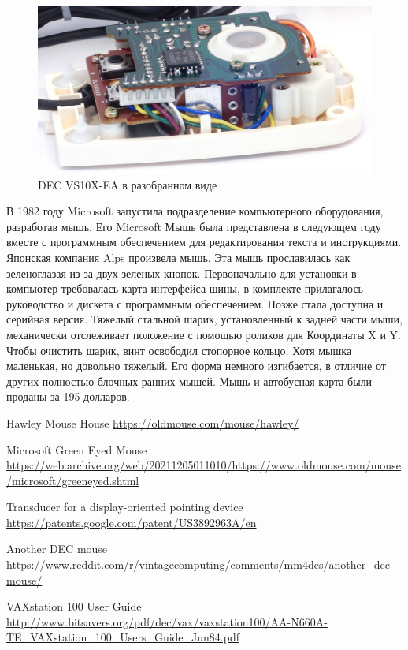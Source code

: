 \documentclass[11pt, a4paper]{article}
\begin{document}
 \begin{figure}[h]
    \centering
    \includegraphics[scale=1]{1983_microsoft_green_eyed_mouse/inside_30.jpg}
    \caption{DEC VS10X-EA в разобранном виде}
    \label{fig:MicrosoftGreenEyedInside}
\end{figure}

В 1982 году Microsoft запустила подразделение компьютерного оборудования, разработав мышь. Его Microsoft Мышь была представлена в следующем году вместе с программным обеспечением для редактирования текста и инструкциями. Японская компания Alps произвела мышь. Эта мышь прославилась как зеленоглазая из-за двух зеленых кнопок. Первоначально для установки в компьютер требовалась карта интерфейса шины, в комплекте прилагалось руководство и дискета с программным обеспечением. Позже стала доступна и серийная версия. Тяжелый стальной шарик, установленный к задней части мыши, механически отслеживает положение с помощью роликов для Координаты X и Y. Чтобы очистить шарик, винт освободил стопорное кольцо. Хотя мышка маленькая, но довольно тяжелый. Его форма немного изгибается, в отличие от других полностью блочных ранних мышей. Мышь и автобусная карта были проданы за 195 долларов.

\begin{thebibliography}{9}
 Hawley Mouse House \url{https://oldmouse.com/mouse/hawley/}

 Microsoft Green Eyed Mouse \url{https://web.archive.org/web/20211205011010/https://www.oldmouse.com/mouse/microsoft/greeneyed.shtml}

 Transducer for a display-oriented pointing device \url{https://patents.google.com/patent/US3892963A/en}

 Another DEC mouse \url{https://www.reddit.com/r/vintagecomputing/comments/mm4des/another_dec_mouse/}

 VAXstation 100 User Guide \url{http://www.bitsavers.org/pdf/dec/vax/vaxstation100/AA-N660A-TE_VAXstation_100_Users_Guide_Jun84.pdf}
\end{thebibliography}
\end{document}
